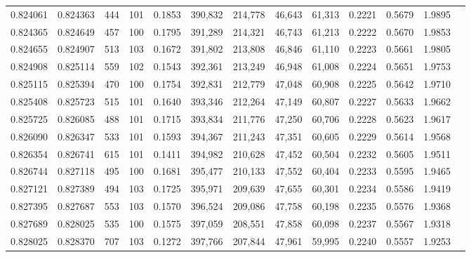 \begin{tabular}{rrrrrrrrrrrrr}
0.824061 & 0.824363 &   444 & 101 &                                     0.1853 & 390,832 & 214,778 &  46,643 &  61,313 & 0.2221 & 0.5679 & 1.9895 \\
0.824365 & 0.824649 &   457 & 100 &                                     0.1795 & 391,289 & 214,321 &  46,743 &  61,213 & 0.2222 & 0.5670 & 1.9853 \\
0.824655 & 0.824907 &   513 & 103 &                                     0.1672 & 391,802 & 213,808 &  46,846 &  61,110 & 0.2223 & 0.5661 & 1.9805 \\
0.824908 & 0.825114 &   559 & 102 &                                     0.1543 & 392,361 & 213,249 &  46,948 &  61,008 & 0.2224 & 0.5651 & 1.9753 \\
0.825115 & 0.825394 &   470 & 100 &                                     0.1754 & 392,831 & 212,779 &  47,048 &  60,908 & 0.2225 & 0.5642 & 1.9710 \\
0.825408 & 0.825723 &   515 & 101 &                                     0.1640 & 393,346 & 212,264 &  47,149 &  60,807 & 0.2227 & 0.5633 & 1.9662 \\
0.825725 & 0.826085 &   488 & 101 &                                     0.1715 & 393,834 & 211,776 &  47,250 &  60,706 & 0.2228 & 0.5623 & 1.9617 \\
0.826090 & 0.826347 &   533 & 101 &                                     0.1593 & 394,367 & 211,243 &  47,351 &  60,605 & 0.2229 & 0.5614 & 1.9568 \\
0.826354 & 0.826741 &   615 & 101 &                                     0.1411 & 394,982 & 210,628 &  47,452 &  60,504 & 0.2232 & 0.5605 & 1.9511 \\
0.826744 & 0.827118 &   495 & 100 &                                     0.1681 & 395,477 & 210,133 &  47,552 &  60,404 & 0.2233 & 0.5595 & 1.9465 \\
0.827121 & 0.827389 &   494 & 103 &                                     0.1725 & 395,971 & 209,639 &  47,655 &  60,301 & 0.2234 & 0.5586 & 1.9419 \\
0.827395 & 0.827687 &   553 & 103 &                                     0.1570 & 396,524 & 209,086 &  47,758 &  60,198 & 0.2235 & 0.5576 & 1.9368 \\
0.827689 & 0.828025 &   535 & 100 &                                     0.1575 & 397,059 & 208,551 &  47,858 &  60,098 & 0.2237 & 0.5567 & 1.9318 \\
0.828025 & 0.828370 &   707 & 103 &                                     0.1272 & 397,766 & 207,844 &  47,961 &  59,995 & 0.2240 & 0.5557 & 1.9253 \\

\end{tabular}
